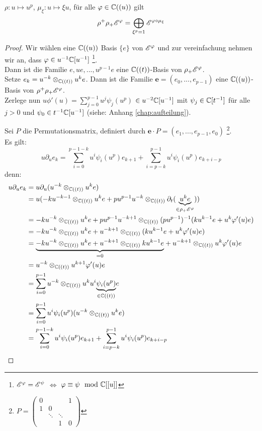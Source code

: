 \begin{lem}
  $\rho:u\mapsto u^p$,
  $\mu_\xi:u\mapsto\xi u$,
  für alle $\varphi \in \mathbb{C}((u))$ gilt
  $$ \rho^+\rho_+\mathscr{E}^\varphi=\bigoplus_{\xi^p=1}\mathscr{E}^{\varphi\circ\mu_\xi} $$
\end{lem}

\begin{proof}

Wir wählen eine $\mathbb{C}((u))$ Basis $\{e\}$ von $\mathscr{E}^\varphi$ und zur
vereinfachung nehmen wir an, dass $\varphi\in u^{-1}\mathbb{C}[u^{-1}]$
\footnote{$\mathscr{E}^\varphi=\mathscr{E}^\psi$ $\Leftrightarrow$ $\varphi\equiv\psi\mod{\mathbb{C}}[[u]]$}.\\
Dann ist die Familie $e,ue,...,u^{p-1}e$ eine $\mathbb{C}((t))$-Basis von
$\rho_+\mathscr{E}^\varphi$.\\
Setze $e_k=u^{-k}\otimes_{\mathbb{C}((t))}u^ke$.
Dann ist die Familie $\mathbf{e}=(e_0,...,e_{p-1})$ eine $\mathbb{C}((u))$-Basis von
$\rho^+\rho_+\mathscr{E}^\varphi$.\\
Zerlege nun $u\phi'(u)=\sum_{j=0}^{p-1}u^j\psi_j(u^p)$ $\in u^{-2}\mathbb{C}[u^{-1}]$ 
mit $\psi_j\in\mathbb{C}[t^{-1}]$ für alle $j>0$ und $\psi_0\in t^{-1}\mathbb{C}[u^{-1}]$
(siehe: Anhang \ref{chap:aufteilung}).

Sei $P$ die Permutationsmatrix, definiert durch
$\mathbf{e}\cdot P=(e_1,...,e_{p-1},e_0)$
\footnote{$P=\begin{pmatrix}0 &  &  & 1\\
1 & 0\\
 & \ddots & \ddots\\
 &  & 1 & 0
\end{pmatrix}$}.\\
Es gilt:\\
$$ u\partial_ue_k= \sum_{i=0}^{p-1-k}u^i\psi_i(u^p)e_{k+1} +
\sum_{i=p-k}^{p-1}u^i\psi_i(u^p)e_{k+i-p} $$
denn:\\
\begin{align*}
  u\partial_ue_k &= u\partial_u(u^{-k}\otimes_{\mathbb{C}((t))}u^ke)\\
  &= u(-ku^{-k-1}\otimes_{\mathbb{C}((t))}u^ke +
    pu^{p-1}u^{-k}\otimes_{\mathbb{C}((t))}\partial_t
    (\underset{\in\rho_+\mathscr{E}^\varphi}{\underbrace{u^ke}}))\\
  &= -ku^{-k}\otimes_{\mathbb{C}((t))}u^ke +
    pu^{p-1}u^{-k+1}\otimes_{\mathbb{C}((t))}(pu^{p-1})^{-1} (ku^{k-1}e 
    + u^k\varphi'(u)e)\\
  &= -ku^{-k}\otimes_{\mathbb{C}((t))}u^ke +
    u^{-k+1}\otimes_{\mathbb{C}((t))}(ku^{k-1}e + u^k\varphi'(u)e)\\
  &= \underset{=0}{\underbrace{-ku^{-k}\otimes_{\mathbb{C}((t))}u^ke +
    u^{-k+1}\otimes_{\mathbb{C}((t))}ku^{k-1}e}} +
    u^{-k+1}\otimes_{\mathbb{C}((t))}u^k\varphi'(u)e\\
  &= u^{-k}\otimes_{\mathbb{C}((t))}u^{k+1}\varphi'(u)e\\
  &= \sum_{i=0}^{p-1}u^{-k}\otimes_{\mathbb{C}((t))}
    u^{k}u^i\underset{\in\mathbb{C}((t))}{\underbrace{\psi_i(u^p)}}e\\
  &= \sum_{i=0}^{p-1}u^i\psi_i(u^p)(u^{-k}\otimes_{\mathbb{C}((t))} u^{k}e)\\
  &= \sum_{i=0}^{p-1-k}u^i\psi_i(u^p)e_{k+1} +
  \sum_{i=p-k}^{p-1}u^i\psi_i(u^p)e_{k+i-p}
\end{align*}


\end{proof}
